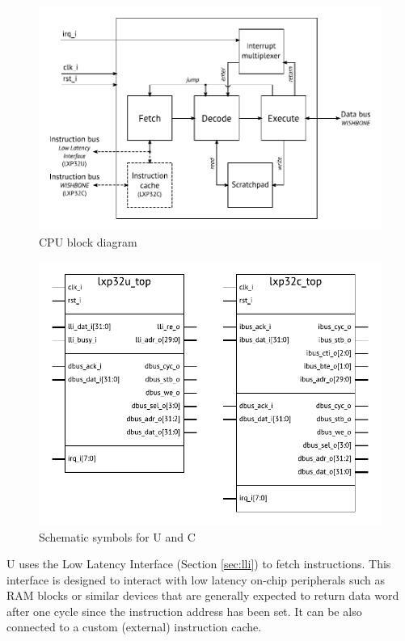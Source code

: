\documentclass[a4paper,12pt,twoside,extrafontsizes]{memoir}
\begin{document}
\begin{figure}[htbp]
	\centering
	\includegraphics[scale=0.85]{images/blockdiagram.pdf}
	\caption{\lxp{} CPU block diagram}
	\label{fig:blockdiagram}
\end{figure}

\begin{figure}[htbp]
	\centering
	\includegraphics[scale=0.85]{images/symbols.pdf}
	\caption{Schematic symbols for \lxp{}U and \lxp{}C}
	\label{fig:symbols}
\end{figure}

\lxp{}U uses the Low Latency Interface (Section \ref{sec:lli}) to fetch instructions. This interface is designed to interact with low latency on-chip peripherals such as RAM blocks or similar devices that are generally expected to return data word after one cycle since the instruction address has been set. It can be also connected to a custom (external) instruction cache.
\end{document}
